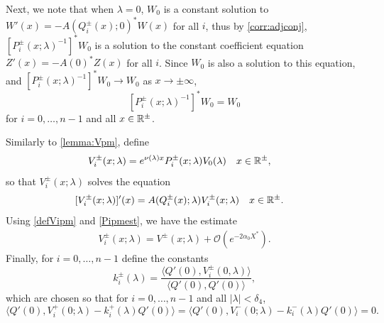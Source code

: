\documentclass[12pt]{elsarticle}
\theoremstyle{plain}
\theoremstyle{definition}
\theoremstyle{remark}
\numberwithin{theorem}{section}
\numberwithin{equation}{section}
\begin{document}
Next, we note that when $\lambda = 0$, $W_0$ is a constant solution to $W'(x) = -A(Q_i^\pm(x); 0)^* W(x)$ for all $i$, thus by \cref{corr:adjconj}, $[P_i^\pm(x; \lambda)^{-1}]^* W_0$ is a solution to the constant coefficient equation $Z'(x) = -A(0)^* Z(x)$ for all $i$. Since $W_0$ is also a solution to this equation, and $[P_i^\pm(x; \lambda)^{-1}]^* W_0 \rightarrow W_0$ as $x \rightarrow \pm \infty$,
\begin{equation}\label{W0conjeq}
[P_i^\pm(x; \lambda)^{-1}]^* W_0 = W_0
\end{equation}
for $i = 0, \dots, n-1$ and all $x \in \mathbb{R}^\pm$.

Similarly to \cref{lemma:Vpm}, define
\begin{align}\label{defVipm}
V_i^\pm(x; \lambda) &= e^{\nu(\lambda)x} P_i^\pm(x; \lambda)V_0(\lambda) && x \in \mathbb{R}^\pm,
\end{align}
so that $V_i^\pm(x; \lambda)$ solves the equation
\begin{align}\label{PDEeigcenter}
[V_i^\pm(x; \lambda)]'(x) &= A(Q_i^\pm(x); \lambda) V_i^\pm(x; \lambda) && x \in \mathbb{R}^\pm.
\end{align}
Using \cref{defVipm} and \cref{Pipmest}, we have the estimate
\begin{align}\label{Vipmest}
V_i^\pm(x; \lambda) = V^\pm(x; \lambda) + \mathcal{O}(e^{-2 \alpha_0 X^*}).
\end{align}
Finally, for $i = 0, \dots, n-1$ define the constants
\begin{equation}\label{defklambda}
k_i^\pm(\lambda) = \frac{\langle Q'(0), V_i^\pm(0, \lambda) \rangle}{\langle Q'(0), Q'(0) \rangle},
\end{equation}
which are chosen so that for $i = 0, \dots, n-1$ and all $|\lambda| < \delta_4$,
\begin{equation}\label{klambdaIP}
\langle Q'(0), V_i^+(0; \lambda) - k_i^+(\lambda)Q'(0) \rangle = 
\langle Q'(0), V_i^-(0; \lambda) - k_i^-(\lambda)Q'(0) \rangle = 0.
\end{equation}
\end{document}
